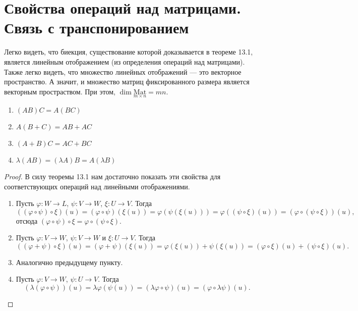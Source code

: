 \section{Свойства операций над матрицами. Связь с транспонированием}

Легко видеть, что биекция, существование которой доказывается в теореме 13.1, является линейным отображением (из определения операций над матрицами). Также легко видеть, что множество линейных отображений --- это векторное пространство. А значит, и множество матриц фиксированного размера является векторным простраством. При этом, $\dim \underset{m \times n}{\mathrm{Mat}} = mn$.

\begin{theorem}
    \begin{enumerate}[nolistsep]
        \item $(AB)C = A(BC)$
        \item $A(B + C) = AB + AC$
        \item $(A + B)C = AC + BC$
        \item $\lambda(AB) = (\lambda A)B = A(\lambda B)$
    \end{enumerate}
\end{theorem}

\begin{proof}
    В силу теоремы 13.1 нам достаточно показать эти свойства для соответствующих операций над линейными отображениями. 
    \begin{enumerate}
        \item Пусть $\varphi: W \rightarrow L$, $\psi: V \rightarrow W$, $\xi: U \rightarrow V$. Тогда
            $$
            ((\varphi \circ \psi) \circ \xi)(u) = (\varphi \circ \psi)(\xi(u)) = \varphi(\psi(\xi(u))) = \varphi((\psi \circ \xi)(u)) = (\varphi \circ (\psi \circ \xi))(u),
            $$
            отсюда $(\varphi \circ \psi) \circ \xi = \varphi \circ (\psi \circ \xi)$.
        \item Пусть $\varphi: V \rightarrow W$, $\psi: V \rightarrow W$ и $\xi: U \rightarrow V$. Тогда
            $$
            ((\varphi + \psi) \circ \xi)(u) = (\varphi + \psi)(\xi(u)) = \varphi(\xi(u)) + \psi(\xi(u)) = (\varphi \circ \xi)(u) + (\psi \circ \xi)(u).
            $$
        \item Аналогично предыдущему пункту.
        \item Пусть $\varphi: V \rightarrow W$, $\psi: U \rightarrow V$. Тогда
            $$
            (\lambda(\varphi \circ \psi))(u) = \lambda\varphi(\psi(u)) = (\lambda\varphi \circ \psi)(u) = (\varphi \circ \lambda\psi)(u).
            $$
    \end{enumerate}
\end{proof}


